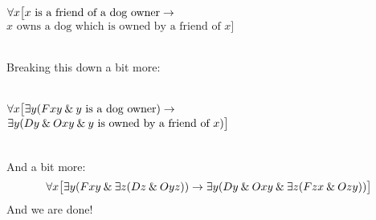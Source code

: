 \
\\$\forall x\bigl[x\text{ is a friend of a dog owner}\rightarrow \phantom{x}$\\
\phantom{x}\hfill $x\text{ owns a dog which is owned by a friend of }x\bigr]$

\
\\Breaking this down a bit more:

\
\\$\forall x\bigl[\exists y(Fxy \mathbin{\&} y\text{ is a dog owner})\rightarrow \phantom{x}$\\
\phantom{x}\hfill $\exists y(Dy \mathbin{\&} Oxy \mathbin{\&} y\text{ is owned by a friend of }x)\bigr]$

\
\\And a bit more:
$$\forall x\bigl[\exists y(Fxy \mathbin{\&} \exists z(Dz \mathbin{\&} Oyz)) \rightarrow \exists y(Dy \mathbin{\&} Oxy \mathbin{\&} \exists z(Fzx \mathbin{\&} Ozy))\bigr]$$
And we are done!


